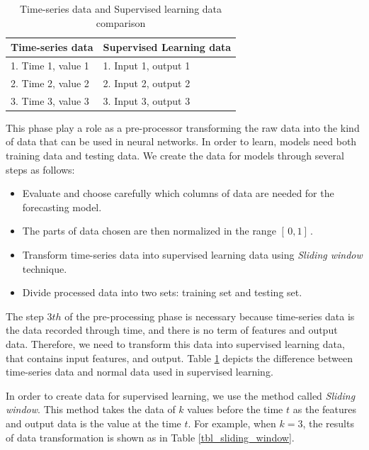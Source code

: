 \documentclass[a4paper,13pt,2p]{report}
\begin{document}
\begin{table}[!t]
\caption{Time-series data and Supervised learning data comparison}
\label{tbl_data_cmp}
\centering
\begin{tabular}{|p{6cm}|p{6cm}|}
 \hline
 Time-series data & Supervised Learning data  \\ 
 \hline
 1. Time 1, value 1 & 1. Input 1, output 1  \\ 
 2. Time 2, value 2 & 2. Input 2, output 2  \\ 
 3. Time 3, value 3 & 3. Input 3, output 3  \\ 
 \hline
\end{tabular}
\end{table}
	
	This phase play a role as a pre-processor transforming the raw data into the kind of data that can be used in neural networks. In order to learn, models need both training data and testing data. We create the data for models through several steps as follows:

\begin{itemize}
\item  Evaluate and choose carefully which columns of data are needed for the forecasting model.
\item  The parts of data chosen are then normalized in the range $[ \, 0, 1 ] \,$.
\item Transform time-series data into supervised learning data using \textit{Sliding window} technique.
\item Divide processed data into two sets: training set and testing set.
\end{itemize}

	The step $3th$ of the pre-processing phase is necessary because time-series data is the data recorded through time, and there is no term of features and output data. Therefore, we need to transform this data into supervised learning data, that contains input features, and output. Table \ref{tbl_data_cmp} depicts the difference between time-series data and normal data used in supervised learning.


	In order to create data for supervised learning, we use the method called \textit{Sliding window}. This method takes the data of $k$ values before the time $t$ as the features and output data is the value at the time $t$. For example, when $k=3$, the results of data transformation is shown as in Table \ref{tbl_sliding_window}.
	
\end{document}

